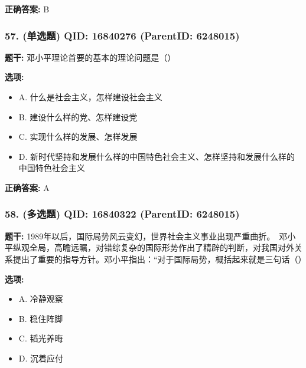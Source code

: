 \documentclass[12pt,UTF8]{ctexart}
\begin{document}
\textbf{正确答案:}
B

\vspace{0.3em}\hrulefill\vspace{0.7em}

\subsubsection*{57. (单选题) \small QID: 16840276 (ParentID: 6248015)}

\textbf{题干:}
邓小平理论首要的基本的理论问题是（）



\textbf{选项:}
\begin{itemize}[leftmargin=*]

  \item A. 什么是社会主义，怎样建设社会主义

  \item B. 建设什么样的党、怎样建设党

  \item C. 实现什么样的发展、怎样发展

  \item D. 新时代坚持和发展什么样的中国特色社会主义、怎样坚持和发展什么样的中国特色社会主义

\end{itemize}

\textbf{正确答案:}
A

\vspace{0.3em}\hrulefill\vspace{0.7em}

\subsubsection*{58. (多选题) \small QID: 16840322 (ParentID: 6248015)}

\textbf{题干:}
1989年以后，国际局势风云变幻，世界社会主义事业出现严重曲折。　邓小平纵观全局，高瞻远瞩，对错综复杂的国际形势作出了精辟的判断，对我国对外关系提出了重要的指导方针。邓小平指出：“对于国际局势，概括起来就是三句话（）



\textbf{选项:}
\begin{itemize}[leftmargin=*]

  \item A. 冷静观察

  \item B. 稳住阵脚

  \item C. 韬光养晦

  \item D. 沉着应付

\end{itemize}
\end{document}
